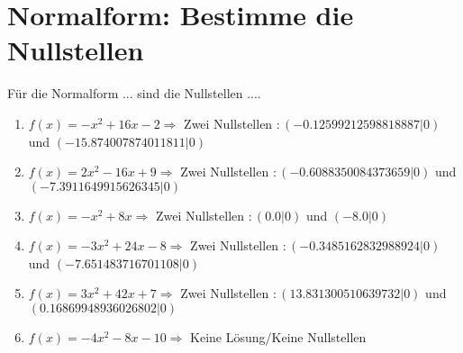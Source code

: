 \documentclass{article}%
\begin{document}
\section{Normalform: Bestimme die Nullstellen}%
\label{sec:NormalformBestimmedieNullstellen}%
Für die Normalform ... sind die Nullstellen ....%
\begin{enumerate}[label=\alph*)]%
\item%
\newline\vspace{0.5cm}$f(x)=-x^2 + 16x - 2 \Rightarrow $ Zwei Nullstellen $: (-0.12599212598818887|0) $ und $ (-15.874007874011811|0) $%
\item%
\newline\vspace{0.5cm}$f(x)=2x^2 - 16x + 9 \Rightarrow $ Zwei Nullstellen $: (-0.6088350084373659|0) $ und $ (-7.3911649915626345|0) $%
\item%
\newline\vspace{0.5cm}$f(x)=-x^2 + 8x \Rightarrow $ Zwei Nullstellen $: (0.0|0) $ und $ (-8.0|0) $%
\item%
\newline\vspace{0.5cm}$f(x)=-3x^2 + 24x - 8 \Rightarrow $ Zwei Nullstellen $: (-0.3485162832988924|0) $ und $ (-7.651483716701108|0) $%
\item%
\newline\vspace{0.5cm}$f(x)=3x^2 + 42x + 7 \Rightarrow $ Zwei Nullstellen $: (13.831300510639732|0) $ und $ (0.16869948936026802|0) $%
\item%
\newline\vspace{0.5cm}$f(x)=-4x^2 - 8x - 10 \Rightarrow  $ Keine Lösung/Keine Nullstellen $ $%
\end{enumerate}

%
\end{document}
